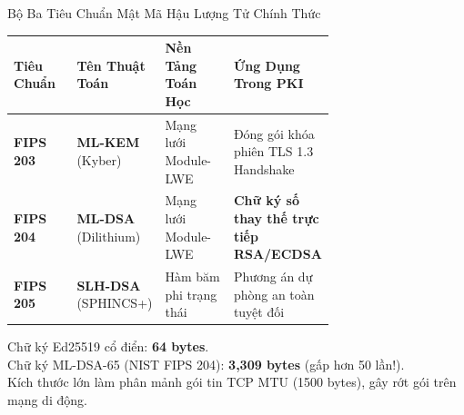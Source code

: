 \begin{frame}{Bộ Ba Tiêu Chuẩn Mật Mã Hậu Lượng Tử Chính Thức}
  \begin{table}[h]
    \centering\scriptsize
    \begin{tabularx}{\linewidth}{@{}p{0.22\linewidth} p{0.24\linewidth} p{0.24\linewidth} X@{}}
      \toprule
      \textbf{Tiêu Chuẩn} & \textbf{Tên Thuật Toán} & \textbf{Nền Tảng Toán Học} & \textbf{Ứng Dụng Trong PKI} \\
      \midrule
      \textbf{FIPS 203} & \textbf{ML-KEM} (Kyber) & Mạng lưới Module-LWE & Đóng gói khóa phiên TLS 1.3 Handshake \\
      \textbf{FIPS 204} & \textbf{ML-DSA} (Dilithium) & Mạng lưới Module-LWE & \textbf{Chữ ký số thay thế trực tiếp RSA/ECDSA} \\
      \textbf{FIPS 205} & \textbf{SLH-DSA} (SPHINCS+) & Hàm băm phi trạng thái & Phương án dự phòng an toàn tuyệt đối \\
      \bottomrule
    \end{tabularx}
  \end{table}

  \begin{pqcbox}
    Chữ ký Ed25519 cổ điển: \textbf{64 bytes}.\\
    Chữ ký ML-DSA-65 (NIST FIPS 204): \textbf{3,309 bytes} (gấp hơn 50 lần!).\\
    Kích thước lớn làm phân mảnh gói tin TCP MTU (1500 bytes), gây rớt gói trên mạng di động.
  \end{pqcbox}
\end{frame}

